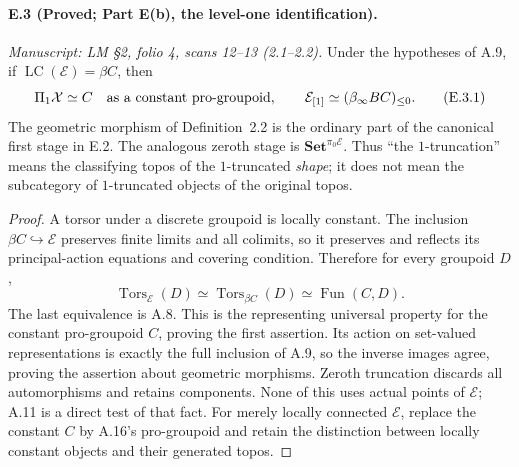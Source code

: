 \paragraph{E.3 (Proved; Part E(b), the level-one identification).}
\textit{Manuscript: LM \S2, folio 4, scans 12--13 (2.1--2.2).}
Under the hypotheses of A.9, if $\operatorname{LC}(\mathcal E)=\beta C$, then
\[
 \Pi_1\mathcal X\simeq C\quad\hbox{as a constant pro-groupoid},
 \qquad
 \mathcal E_{[1]}\simeq(\beta_\infty BC)_{\le0}.
                                                        \tag{E.3.1}
\]
The geometric morphism of Definition~2.2 is the ordinary part of the canonical first stage in E.2. The analogous zeroth stage is $\mathbf{Set}^{\pi_0\mathcal E}$. Thus ``the $1$-truncation'' means the classifying topos of the $1$-truncated \emph{shape}; it does not mean the subcategory of $1$-truncated objects of the original topos.
\begin{proof}
A torsor under a discrete groupoid is locally constant. The inclusion $\beta C\hookrightarrow\mathcal E$ preserves finite limits and all colimits, so it preserves and reflects its principal-action equations and covering condition. Therefore for every groupoid $D$,
\[
 \operatorname{Tors}_{\mathcal E}(D)
     \simeq\operatorname{Tors}_{\beta C}(D)
     \simeq\operatorname{Fun}(C,D).
\]
The last equivalence is A.8. This is the representing universal property for the constant pro-groupoid $C$, proving the first assertion. Its action on set-valued representations is exactly the full inclusion of A.9, so the inverse images agree, proving the assertion about geometric morphisms. Zeroth truncation discards all automorphisms and retains components. None of this uses actual points of $\mathcal E$; A.11 is a direct test of that fact. For merely locally connected $\mathcal E$, replace the constant $C$ by A.16's pro-groupoid and retain the distinction between locally constant objects and their generated topos. 
\end{proof}

